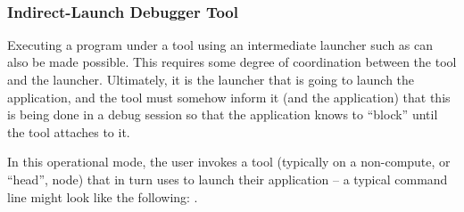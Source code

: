 {\large {}}

{\large {}}

{\large {}}

{\large {}}

{\large {}}




 \\

\subsubsection{Indirect-Launch Debugger Tool}

Executing a program under a tool using an intermediate launcher such as  can also be made possible. This requires some degree of coordination between the tool and the launcher. Ultimately, it is the launcher that is going to launch the application, and the tool must somehow inform it (and the application) that this is being done in a debug session so that the application knows to ``block'' until the tool attaches to it.

In this operational mode, the user invokes a tool (typically on a non-compute, or ``head'', node) that in turn uses  to launch their application – a typical command line might look like the following: .

